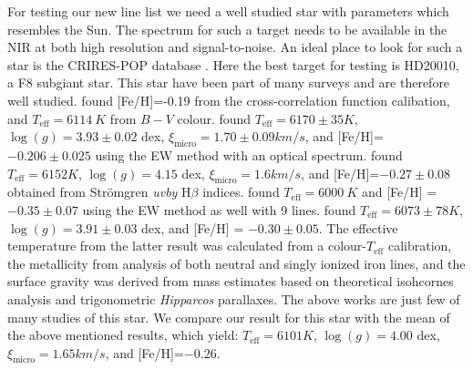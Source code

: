 \documentclass{aa}
\begin{document}
For testing our new line list we need a well studied star with
parameters which resembles the Sun. The spectrum for such a target
needs to be available in the NIR at both high resolution and
signal-to-noise. An ideal place to look for such a star is the
CRIRES-POP database \citep{Lebzelter2012}. Here the best target for
testing is HD20010, a F8 subgiant star. This star have been part of
many surveys and are therefore well studied. \cite{Mortier2013} found
[Fe/H]=-0.19 from the cross-correlation function calibation, and
$T_\mathrm{eff}=\SI{6114}{K}$ from $B-V$ colour. \cite{Gonzalez2010}
found $T_\mathrm{eff} = 6170\pm35\si{K}$, $\log(g) = 3.93\pm0.02$ dex,
$\xi_\mathrm{micro} = 1.70\pm0.09\si{km/s}$, and [Fe/H]=$-0.206\pm0.025$
using the EW method with an optical spectrum. \cite{Balachandran1990}
found $T_\mathrm{eff} = 6152\si{K}$, $\log(g) = 4.15$ dex,
$\xi_\mathrm{micro} = 1.6\si{km/s}$, and [Fe/H]=$-0.27\pm0.08$ obtained
from Str\"{o}mgren \emph{uvby} H$\beta$ indices. \cite{Favata1997} found
$T_\mathrm{eff}=\SI{6000}{K}$ and [Fe/H] = $-0.35\pm0.07$ using the EW
method as well with 9 lines. \cite{Ramirez2012} found $T_\mathrm{eff}
= 6073\pm78\si{K}$, $\log(g) = 3.91\pm0.03$ dex, and [Fe/H] =
$-0.30\pm0.05$. The effective temperature from the latter result was
calculated from a colour-$T_\mathrm{eff}$ calibration, the metallicity
from analysis of both neutral and singly ionized iron lines, and the
surface gravity was derived from mass estimates based on theoretical
isohcornes analysis and trigonometric \emph{Hipparcos} parallaxes. The
above works are just few of many studies of this star. We compare our
result for this star with the mean of the above mentioned results,
which yield: $T_\mathrm{eff} = 6101\si{K}$, $\log(g) = 4.00$ dex,
$\xi_\mathrm{micro} = 1.65\si{km/s}$, and [Fe/H]=$-0.26$.
\end{document}

